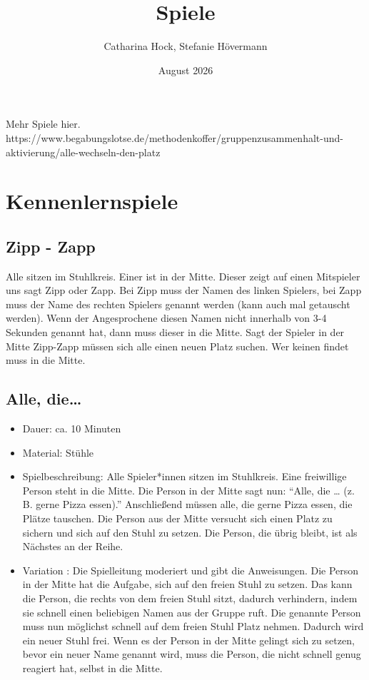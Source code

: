 \documentclass[a4paper, 11pt]{article}
\title{Spiele}
\author{Catharina Hock, Stefanie Hövermann}
\date{August  2026}
\begin{document}
\maketitle 
Mehr Spiele hier. https://www.begabungslotse.de/methodenkoffer/gruppenzusammenhalt-und-aktivierung/alle-wechseln-den-platz


\section{Kennenlernspiele}

\subsection{Zipp - Zapp}

Alle sitzen im Stuhlkreis. Einer ist in der Mitte. Dieser zeigt auf einen Mitspieler uns sagt Zipp oder Zapp. Bei Zipp muss der Namen des linken Spielers, bei Zapp muss der Name des rechten Spielers genannt werden (kann auch mal getauscht werden). Wenn der Angesprochene diesen Namen nicht innerhalb von 3-4 Sekunden genannt hat, dann muss dieser in die Mitte. Sagt der Spieler in der Mitte Zipp-Zapp müssen sich alle einen neuen Platz suchen. Wer keinen findet muss in die Mitte.


\subsection{Alle, die…}

\begin{itemize}
    \item Dauer: ca. 10 Minuten
    \item Material: Stühle
    \item Spielbeschreibung: Alle Spieler*innen sitzen im Stuhlkreis. Eine freiwillige Person steht in die Mitte. Die Person in der Mitte sagt nun: ``Alle, die … (z. B. gerne Pizza essen).'' Anschließend müssen alle, die gerne Pizza essen, die Plätze tauschen. Die Person aus der Mitte versucht sich einen Platz zu sichern und sich auf den Stuhl zu setzen. Die Person, die übrig bleibt, ist als Nächstes an der Reihe.
    \item Variation : Die Spielleitung moderiert und gibt die Anweisungen. 
    Die Person in der Mitte hat die Aufgabe, sich auf den freien Stuhl zu setzen. Das kann die Person, die rechts von dem freien Stuhl sitzt, dadurch verhindern, indem sie schnell einen beliebigen Namen aus der Gruppe ruft. Die genannte Person muss nun möglichst schnell auf dem freien Stuhl Platz nehmen. Dadurch wird ein neuer Stuhl frei. Wenn es der Person in der Mitte gelingt sich zu setzen, bevor ein neuer Name genannt wird, muss die Person, die nicht schnell genug reagiert hat, selbst in die Mitte.
\end{itemize}
\end{document}
